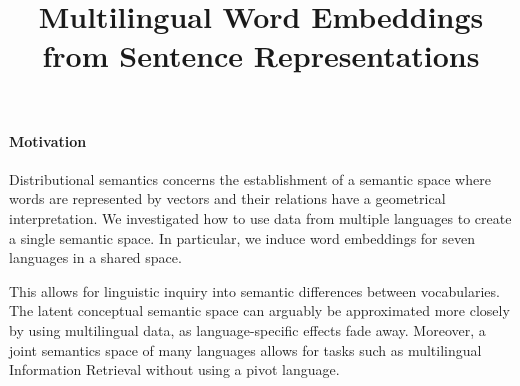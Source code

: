 \documentclass[a4paper,11pt]{article}
\title{Multilingual Word Embeddings from Sentence Representations}
\date{}
\begin{document}
\maketitle
\thispagestyle{empty}
\pagestyle{empty}


\paragraph{Motivation}



Distributional semantics concerns the establishment of a semantic space where words are represented by vectors and their relations have a geometrical interpretation. We investigated how to use data from multiple languages to create a single semantic space. In particular, we induce word embeddings for seven languages in a shared space.  

This allows for linguistic inquiry into semantic differences between vocabularies. The latent conceptual semantic space can arguably be approximated more closely by using multilingual data, as language-specific effects fade away. 
Moreover, a joint semantics space of many languages allows for tasks such as multilingual Information Retrieval without using a pivot language.



\end{document}
